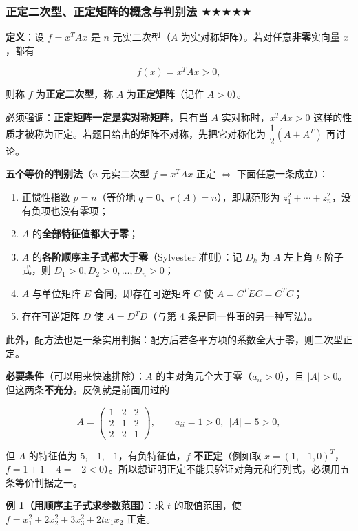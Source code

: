 \documentclass[11pt,openany,UTF8]{ctexbook}
\begin{document}
\subsubsection{正定二次型、正定矩阵的概念与判别法 $\bigstar$$\bigstar$$\bigstar$$\bigstar$$\bigstar$}

\textbf{定义}：设 $f=x^TAx$ 是 $n$ 元实二次型（$A$ 为实对称矩阵）。若对任意\textbf{非零}实向量 $x$，都有

\[f(x)=x^TAx>0,\]

则称 $f$ 为\textbf{正定二次型}，称 $A$ 为\textbf{正定矩阵}（记作 $A>0$）。

必须强调：\textbf{正定矩阵一定是实对称矩阵}，只有当 $A$ 实对称时，$x^TAx>0$ 这样的性质才被称为正定。若题目给出的矩阵不对称，先把它对称化为 $\dfrac12(A+A^T)$ 再讨论。

\textbf{五个等价的判别法}（$n$ 元实二次型 $f=x^TAx$ 正定 $\iff$ 下面任意一条成立）：

\begin{enumerate}
\item 正惯性指数 $p=n$（等价地 $q=0$、$r(A)=n$），即规范形为 $z_1^2+\cdots+z_n^2$，没有负项也没有零项；
\item $A$ 的\textbf{全部特征值都大于零}；
\item $A$ 的\textbf{各阶顺序主子式都大于零}（Sylvester 准则）：记 $D_k$ 为 $A$ 左上角 $k$ 阶子式，则 $D_1>0,D_2>0,\dots,D_n>0$；
\item $A$ 与单位矩阵 $E$ \textbf{合同}，即存在可逆矩阵 $C$ 使 $A=C^TEC=C^TC$；
\item 存在可逆矩阵 $D$ 使 $A=D^TD$（与第 4 条是同一件事的另一种写法）。
\end{enumerate}
此外，配方法也是一条实用判据：配方后若各平方项的系数全大于零，则二次型正定。

\textbf{必要条件}（可以用来快速排除）：$A$ 的主对角元全大于零（$a_{ii}>0$），且 $\vert A\vert>0$。但这两条\textbf{不充分}。反例就是前面用过的

\[A=\begin{pmatrix}1&2&2\\2&1&2\\2&2&1\end{pmatrix},\qquad a_{ii}=1>0,\ \ \vert A\vert=5>0,\]

但 $A$ 的特征值为 $5,-1,-1$，有负特征值，$f$ \textbf{不正定}（例如取 $x=(1,-1,0)^T$，$f=1+1-4=-2<0$）。所以想证明正定不能只验证对角元和行列式，必须用五条等价判据之一。

\textbf{例 1（用顺序主子式求参数范围）}：求 $t$ 的取值范围，使 $f=x_1^2+2x_2^2+3x_3^2+2tx_1x_2$ 正定。
\end{document}
